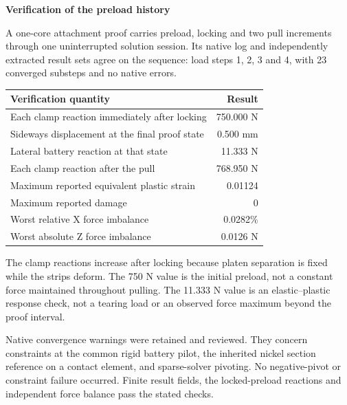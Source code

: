 \documentclass[10pt,a4paper]{article}
\newcommand{\PageTitle}[1]{{\LARGE\bfseries\color{Navy}#1\par}\vspace{7pt}}
\begin{document}
\clearpage
\PageTitle{Verification of the preload history}
A one-core attachment proof carries preload, locking and two pull increments through one uninterrupted solution session. Its native log and independently extracted result sets agree on the sequence: load steps 1, 2, 3 and 4, with 23 converged substeps and no native errors.

\begin{center}
\begin{tabular}{p{.65\linewidth}r}\toprule
Verification quantity & Result\\\midrule
Each clamp reaction immediately after locking & 750.000 N\\
Sideways displacement at the final proof state & 0.500 mm\\
Lateral battery reaction at that state & 11.333 N\\
Each clamp reaction after the pull & 768.950 N\\
Maximum reported equivalent plastic strain & 0.01124\\
Maximum reported damage & 0\\
Worst relative X force imbalance & 0.0282\%\\
Worst absolute Z force imbalance & 0.0126 N\\\bottomrule
\end{tabular}
\end{center}
The clamp reactions increase after locking because platen separation is fixed while the strips deform. The 750 N value is the initial preload, not a constant force maintained throughout pulling. The 11.333 N value is an elastic--plastic response check, not a tearing load or an observed force maximum beyond the proof interval.

\begin{center}
\end{center}
Native convergence warnings were retained and reviewed. They concern constraints at the common rigid battery pilot, the inherited nickel section reference on a contact element, and sparse-solver pivoting. No negative-pivot or constraint failure occurred. Finite result fields, the locked-preload reactions and independent force balance pass the stated checks.
\end{document}
